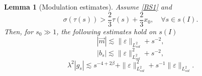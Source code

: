 \documentclass[16pt,english, oneside,reqno]{smfart}
\newcommand{\vare}{{\varepsilon}}
\newtheorem{lemma}[theorem]{Lemma}
\begin{document}
\begin{lemma}[Modulation estimates]\label{lemma_mod_estimates_after_decomp}
    Assume \eqref{BS1} and %
    \begin{equation}
        \sigma(\tau(s)) > \frac{2}{3}\tau(s)+\frac{2}{3}x_0, \quad \forall s\in s(I).
    \end{equation}
    Then, for $s_0\gg1$, the following estimates hold on $s(I)$
    \begin{equation}\label{estimate_on_m_mod_estim}
        |\vec{m}| \lesssim \| \vare \|_{L^2_{sol}} + s^{-2},
    \end{equation}
    \begin{equation}\label{estimation_on_bs_mod_estim}
        |b_s| \lesssim \|\vare\|^2_{L^2_{sol}} + s^{-2},
    \end{equation}
    \begin{equation}\label{estimation_on_gs_mod_estim}
        \lambda^2|g_s| \lesssim s^{-4+2\beta}+\|\vare \|^2_{L^2_{sol}} + s^{-1}\|\vare \|_{L^2_{sol}}.
    \end{equation}
\end{lemma}
\end{document}
